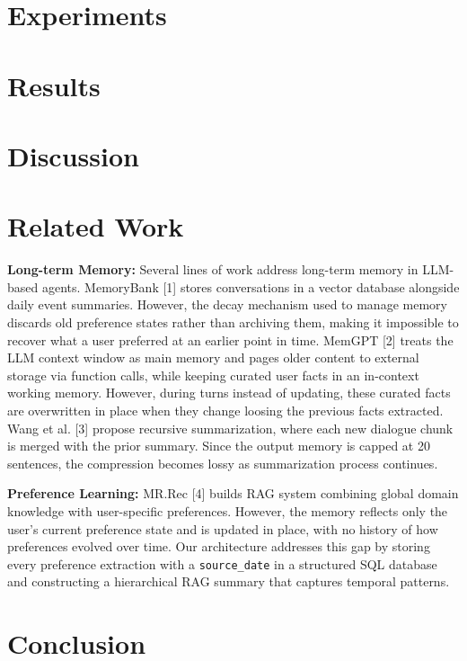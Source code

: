 \documentclass{article}
\begin{document}
\section{Experiments}

\section{Results}
\label{results}



\section{Discussion}


\section{Related Work}

\textbf{Long-term Memory: } Several lines of work address long-term memory in LLM-based agents.
MemoryBank [1] stores conversations in a vector database alongside daily event summaries. However, the decay mechanism used to manage memory discards old preference states rather than archiving them, making it impossible to recover what a user preferred at an earlier point in time.
MemGPT [2] treats the LLM context window as main memory and pages older content to external storage via function calls, while keeping curated user facts in an in-context working memory. However, during turns instead of updating, these curated facts are overwritten in place when they change loosing the previous facts extracted.
Wang et al. [3] propose recursive summarization, where each new dialogue chunk is merged with the prior summary. Since the output memory is capped at 20 sentences, the compression becomes lossy as summarization process continues.

\textbf{Preference Learning: } MR.Rec [4] builds RAG system combining global domain knowledge with user-specific preferences. However, the memory reflects only the user's current preference state and is updated in place, with no history of how preferences evolved over time.
Our architecture addresses this gap by storing every preference extraction with a \texttt{source\_date} in a structured SQL database and constructing a hierarchical RAG summary that captures temporal patterns.


\section{Conclusion}
\end{document}

